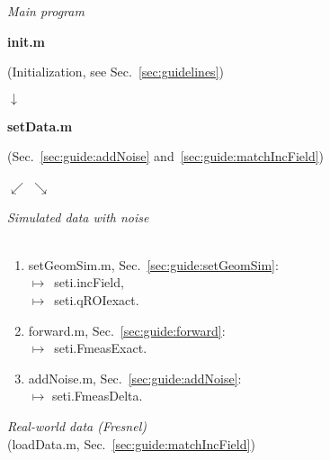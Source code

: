 \hfill\begingroup\color{gray}\vrule width 1pt\endgroup\hfill
\begin{minipage}[t]{\dimexpr.56\textwidth-\tabcolsep-.5pt}

\centerline{\emph{Main program}}
\vspace*{-0.2cm}

\hrulefill

\centerline{\textbf{\textsf{init.m}}}

\centering (Initialization, see Sec.~\ref{sec:guidelines})

\centering $\downarrow$
\vspace*{-0.2cm}

\hrulefill

\centering \textbf{\textsf{setData.m}}

\centering (Sec.~\ref{sec:guide:addNoise} and~\ref{sec:guide:matchIncField})

\medskip
\centering $\swarrow$ \hspace*{3cm} $\searrow$
\medskip

\begin{minipage}[t]{\dimexpr.5\textwidth-\tabcolsep-.5pt}
\centering \emph{Simulated data with noise} \\ \ 
\smallskip

\begin{enumerate}[topsep=0mm, itemsep=0mm, parsep=0mm, leftmargin=3mm, labelsep=0.5mm]
 \item \textsf{setGeomSim.m}, Sec.~\ref{sec:guide:setGeomSim}: \\ $\mapsto$~\textsf{seti.incField},\\ $\mapsto$~\textsf{seti.qROIexact}.
 \item \textsf{forward.m}, Sec.~\ref{sec:guide:forward}: \\ $\mapsto$~\textsf{seti.FmeasExact}.
 \item \textsf{addNoise.m}, Sec.~\ref{sec:guide:addNoise}: \\ $\mapsto$ \textsf{seti.FmeasDelta}.
\end{enumerate}
\end{minipage}
%
\hfill\begingroup\color{gray}\vrule width 0.5pt\endgroup\hfill
%
\begin{minipage}[t]{\dimexpr.5\textwidth-\tabcolsep-.5pt}
\centering \emph{Real-world data (Fresnel)}\\ (\textsf{loadData.m}, Sec.~\ref{sec:guide:matchIncField})
\smallskip


\end{minipage}
\end{minipage}
